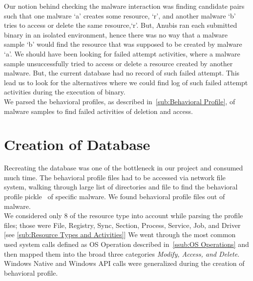 Our notion behind checking the malware interaction was finding candidate pairs such that one malware `a' creates some resource, `r', and another malware `b' tries to access or delete the same resource,`r'.
But, Anubis ran each submitted binary in an isolated environment, hence there was no way that a malware sample `b' would find the resource that was supposed to be created by malware `a'.
We should have been looking for failed attempt activities, where a malware sample unsuccessfully tried to access or delete a resource created by another malware. But, the current database had no record of such failed attempt.
This lead us to look for the alternatives where we could find log of such failed attempt activities during the execution of binary.\\

We parsed the behavioral profiles, as described in~\autoref{sub:Behavioral Profile}, of malware samples to find failed activities of deletion and access.
\section{Creation of Database}
\label{sec:Creation of Database}
Recreating the database was one of the bottleneck in our project and consumed much time.
The behavioral profile files had to be accessed via network file system, walking through large list of directories and file to find the behavioral profile pickle~\cite[]{pythonpickle} of specific malware.
We found \emph{\gettotalmalwareii{}} behavioral profile files out of \emph{\gettotalmalwarei{}} malware.\\

We considered only 8 of the resource type into account while parsing the profile files; those were File, Registry, Sync, Section, Process, Service, Job, and Driver [see \autoref{sub:Resource Types and Activities}]
We went through the most common used system calls defined as OS Operation described in~\autoref{ssub:OS Operations} and then mapped them into the broad three categories \emph{Modify, Access, and Delete}.
Windows Native and Windows API calls were generalized during the creation of behavioral profile.

